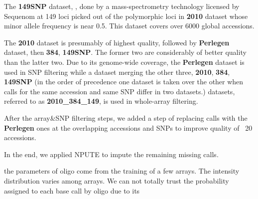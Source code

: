 \documentclass[a4paper,10pt]{article}
\begin{document}
The \textbf{149SNP} dataset, \cite{...}, done by a mass-spectrometry technology licensed by Sequenom at 149 loci picked out of the polymorphic loci in \textbf{2010} dataset whose minor allele frequency is near 0.5. This dataset covers over 6000 global accessions.

The \textbf{2010} dataset is presumably of highest quality, followed by \textbf{Perlegen} dataset, then \textbf{384}, \textbf{149SNP}. The former two are considerably of better quality than the latter two. Due to its genome-wide coverage, the \textbf{Perlegen} dataset is used in SNP filtering while a dataset merging the other three, \textbf{2010}, \textbf{384}, \textbf{149SNP} (in the order of precedence one dataset is taken over the other when calls for the same accession and same SNP differ in two datasets.) datasets, referred to as \textbf{2010_384_149}, is used in whole-array filtering.

After the array&SNP filtering steps, we added a step of replacing calls with the \textbf{Perlegen} ones at the overlapping accessions and SNPs to improve quality of ~20 accessions.

In the end, we applied NPUTE \cite{} to impute the remaining missing calls.

the parameters of oligo come from the training of a few arrays. The intensity distribution varies among arrays.
We can not totally trust the probability assigned to each base call by oligo due to its 
\end{document}
